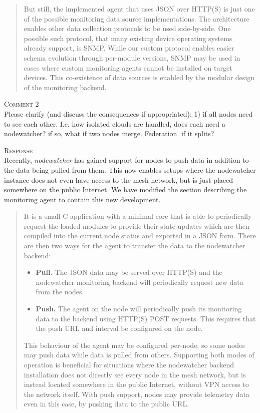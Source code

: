 \documentclass[12pt,twoside,a4paper]{report}
\newcommand{\nodewatcher}{\textit{nodewatcher}}
\begin{document}
\begin{quote}
But still, the implemented agent that uses JSON over HTTP(S) is just one of the possible monitoring data source implementations.
The architecture enables other data collection protocols to be used side-by-side.
One possible such protocol, that many existing device operating systems already support, is SNMP.
While our custom protocol enables easier schema evolution through per-module versions, SNMP may be used in cases where custom monitoring agents cannot be installed on target devices.
This co-existence of data sources is enabled by the modular design of the monitoring backend.
\end{quote}

\vspace{0.5cm}\noindent\textsc{Comment 2}\\
Please clarify (and discuss the consequences if appropriated): 1) if all nodes need to see each other. I.e. how isolated clouds are handled, does each need a nodewatcher? if so, what if two nodes merge. Federation. if it splits?

\vspace{0.5cm}\noindent\textsc{Response}\\
Recently, \nodewatcher{} has gained support for nodes to push data in addition to the data being pulled from them. 
This now enables setups where the nodewatcher instance does not even have access to the mesh network, but is just placed somewhere on the public Internet.
We have modified the section describing the monitoring agent to contain this new development.

\begin{quote}
It is a small C application with a minimal core that is able to periodically request the loaded modules to provide their state updates which are then compiled into the current node status and exported in a JSON form.
There are then two ways for the agent to transfer the data to the nodewatcher backend:
\begin{itemize}
    \item \textbf{Pull.} The JSON data may be served over HTTP(S) and the nodewatcher monitoring backend will periodically request new data from the nodes.

    \item \textbf{Push.} The agent on the node will periodically push its monitoring data to the backend using HTTP(S) POST requests. This requires that the push URL and interval be configured on the node.
\end{itemize}

This behaviour of the agent may be configured per-node, so some nodes may push data while data is pulled from others.
Supporting both modes of operation is beneficial for situations where the nodewatcher backend installation does not directly see every node in the mesh network, but is instead located somewhere in the public Internet, without VPN access to the network itself.
With push support, nodes may provide telemetry data even in this case, by pushing data to the public URL.
\end{quote}
\end{document}
